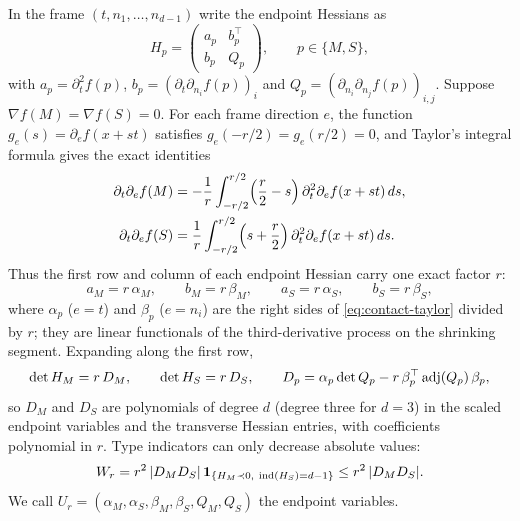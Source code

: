 \begin{lemma}\label{lem:contact-endpoint}
In the frame $(t,n_1,\dots,n_{d-1})$ write the endpoint Hessians as
\begin{equation}\label{eq:contact-Hblock}
H_p=\begin{pmatrix}a_p&b_p^{\top}\\ b_p&Q_p\end{pmatrix},\qquad p\in\{M,S\},
\end{equation}
with $a_p=\partial_t^2f(p)$, $b_p=(\partial_t\partial_{n_i}f(p))_{i}$ and $Q_p=(\partial_{n_i}\partial_{n_j}f(p))_{i,j}$. Suppose $\nabla f(M)=\nabla f(S)=0$. For each frame direction $e$, the function $g_e(s)=\partial_ef(x+st)$ satisfies $g_e(-r/2)=g_e(r/2)=0$, and Taylor's integral formula gives the exact identities
\begin{equation}\label{eq:contact-taylor}
\begin{aligned}
\partial_t\partial_ef(M)&=-\frac1r\int_{-r/2}^{r/2}\Bigl(\frac r2-s\Bigr)\,\partial_t^2\partial_ef(x+st)\,ds,\\
\partial_t\partial_ef(S)&=\frac1r\int_{-r/2}^{r/2}\Bigl(s+\frac r2\Bigr)\,\partial_t^2\partial_ef(x+st)\,ds .
\end{aligned}
\end{equation}
Thus the first row and column of each endpoint Hessian carry one exact factor $r$:
\begin{equation}\label{eq:contact-scaled}
a_M=r\,\alpha_M,\qquad b_M=r\,\beta_M,\qquad a_S=r\,\alpha_S,\qquad b_S=r\,\beta_S,
\end{equation}
where $\alpha_p$ ($e=t$) and $\beta_p$ ($e=n_i$) are the right sides of \eqref{eq:contact-taylor} divided by $r$; they are linear functionals of the third-derivative process on the shrinking segment. Expanding along the first row,
\begin{equation}\label{eq:contact-detrD}
\det H_M=r\,D_M,\qquad\det H_S=r\,D_S,\qquad D_p=\alpha_p\det Q_p-r\,\beta_p^{\top}\operatorname{adj}(Q_p)\,\beta_p ,
\end{equation}
so $D_M$ and $D_S$ are polynomials of degree $d$ (degree three for $d=3$) in the scaled endpoint variables and the transverse Hessian entries, with coefficients polynomial in $r$. Type indicators can only decrease absolute values:
\begin{equation}\label{eq:contact-Wr}
W_r=r^2\,|D_MD_S|\,\mathbf 1_{\{H_M\prec0,\ \operatorname{ind}(H_S)=d-1\}}\le r^2\,|D_MD_S| .
\end{equation}
We call $U_r=(\alpha_M,\alpha_S,\beta_M,\beta_S,Q_M,Q_S)$ the endpoint variables.
\end{lemma}

